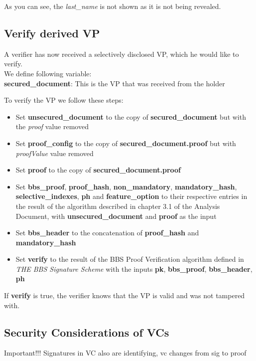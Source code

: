 \documentclass[
	a4paper               %
	,bibliography=totoc   %
	,listof=totoc         %
	,monolingual
]{bfhthesis}              %
\begin{document}
As you can see, the \textit{last\_name} is not shown as it is not being revealed.

\subsection{Verify derived VP}
\label{subsub:verifyvp}
A verifier has now received a selectively disclosed VP, which he would like to verify.\\

We define following variable:\\
\textbf{secured\_document}: This is the VP that was received from the holder\newpage

To verify the VP we follow these steps:
\begin{itemize}
	\item Set \textbf{unsecured\_document} to the copy of \textbf{secured\_document} but with the \textit{proof} value removed
	\item Set \textbf{proof\_config} to the copy of \textbf{secured\_document.proof} but with \textit{proofValue} value removed
	\item Set \textbf{proof} to the copy of \textbf{secured\_document.proof}
	\item Set \textbf{bbs\_proof}, \textbf{proof\_hash}, \textbf{non\_mandatory}, \textbf{mandatory\_hash}, \textbf{selective\_indexes}, \textbf{ph} and \textbf{feature\_option} to their respective entries in the result of the algorithm described in chapter 3.1 of the Analysis Document, with \textbf{unsecured\_document} and \textbf{proof} as the input
	\item Set \textbf{bbs\_header} to the concatenation of \textbf{proof\_hash} and \textbf{mandatory\_hash}
	\item Set \textbf{verify} to the result of the BBS Proof Verification algorithm defined in \textit{THE BBS Signature Scheme}\cite{bbs-signature-scheme} with the inputs \textbf{pk}, \textbf{bbs\_proof}, \textbf{bbs\_header}, \textbf{ph}
\end{itemize}

If \textbf{verify} is true, the verifier knows that the VP is valid and was not tampered with. 

\subsection{Security Considerations of VCs}

Important!!! Signatures in VC also are identifying, vc changes from sig to proof
\end{document}
